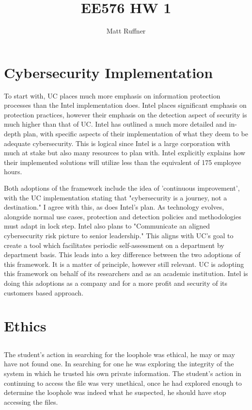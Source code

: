 \documentclass[letterpaper]{article}
\title{EE576 HW 1}
\author{Matt Ruffner}
\begin{document}
\maketitle

\section{Cybersecurity Implementation}

To start with, UC places much more emphasis on information protection processes than the Intel implementation does. Intel places significant emphasis on protection practices, however their emphasis on the detection aspect of security is much higher than that of UC. Intel has outlined a much more detailed and in-depth plan, with specific aspects of their implementation of what they deem to be adequate cybersecurity. This is logical since Intel is a large corporation with much at stake but also many resources to plan with. Intel explicitly explains how their implemented solutions will utilize less than the equivalent of 175 employee hours. 

Both adoptions of the framework include the idea of 'continuous improvement', with the UC implementation stating that "cybersecurity is a journey, not a destination." I agree with this, as does Intel's plan. As technology evolves, alongside normal use cases, protection and detection policies and methodologies must adapt in lock step. Intel also plans to "Communicate an aligned cybersecurity
risk picture to senior leadership." This aligns with UC's goal to create a tool which facilitates periodic self-assessment on a department by department basis. This leads into a key difference between the two adoptions of this framework. It is a matter of principle, however still relevant. UC is adopting this framework on behalf of its researchers and as an academic institution. Intel is doing this adoptions as a company and for a more profit and security of its customers based approach. 

\section{Ethics}
\subsection{}
The student's action in searching for the loophole was ethical, he may or may have not found one. In searching for one he was exploring the integrity of the system in which he trusted his own private information.
The student's action in continuing to access the file was very unethical, once he had explored enough to determine the loophole was indeed what he suspected, he should have stop accessing the files.
\end{document}
